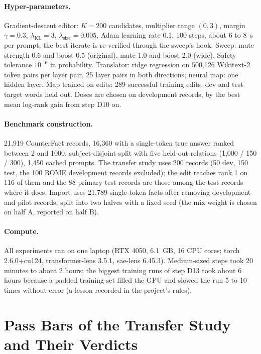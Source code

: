 \documentclass[11pt,twocolumn]{article}
\begin{document}
\paragraph{Hyper-parameters.} Gradient-descent editor: $K=200$ candidates, multiplier range $(0,3)$, margin $\gamma=0.3$, $\lambda_{\mathrm{KL}}=3$, $\lambda_{\mathrm{size}}=0.005$, Adam learning rate 0.1, 100 steps, about 6 to 8~s per prompt; the best iterate is re-verified through the sweep's hook. Sweep: mute strength 0.6 and boost 0.5 (original), mute 1.0 and boost 2.0 (wide). Safety tolerance $10^{-6}$ in probability. Translator: ridge regression on 500,126 Wikitext-2 token pairs per layer pair, 25 layer pairs in both directions; neural map: one hidden layer. Map trained on edits: 289 successful training edits, dev and test target words held out. Doses are chosen on development records, by the best mean log-rank gain from step D10 on.

\paragraph{Benchmark construction.} 21,919 CounterFact records, 16,360 with a single-token true answer ranked between 2 and 1000, subject-disjoint split with five held-out relations (1,000 / 150 / 300), 1,450 cached prompts. The transfer study uses 200 records (50 dev, 150 test, the 100 ROME development records excluded); the edit reaches rank 1 on 116 of them and the 88 primary test records are those among the test records where it does. Import uses 21,789 single-token facts after removing development and pilot records, split into two halves with a fixed seed (the mix weight is chosen on half A, reported on half B).

\paragraph{Compute.} All experiments ran on one laptop (RTX 4050, 6.1~GB, 16 CPU cores; torch 2.6.0+cu124, transformer-lens 3.5.1, sae-lens 6.45.3). Medium-sized steps took 20 minutes to about 2 hours; the biggest training runs of step D13 took about 6 hours because a padded training set filled the GPU and slowed the run 5 to 10 times without error (a lesson recorded in the project's rules).

\section{Pass Bars of the Transfer Study and Their Verdicts}
\label{app:gates}
\end{document}
